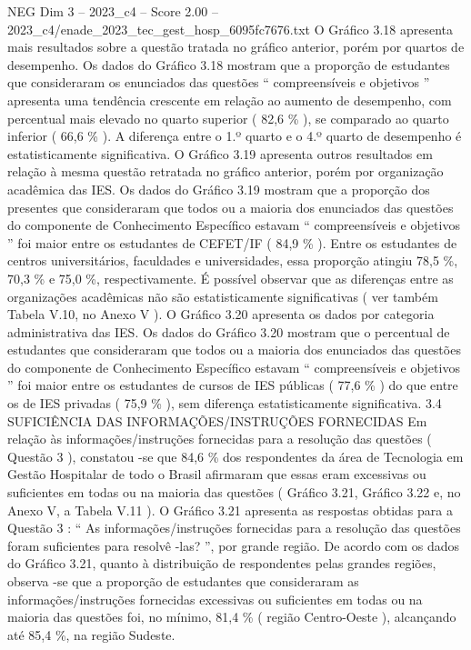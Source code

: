 \begin{textsample}{NEG Dim 3 – 2023\_c4 – Score 2.00 – 2023\_c4/enade\_2023\_tec\_gest\_hosp\_6095fc7676.txt}
O Gráfico 3.18 apresenta mais resultados sobre a questão tratada no gráfico anterior, porém por quartos de desempenho.
Os dados do Gráfico 3.18 mostram que a proporção de estudantes que consideraram os enunciados das questões “ compreensíveis e objetivos ” apresenta uma tendência crescente em relação ao aumento de desempenho, com percentual mais elevado no quarto superior ( 82,6 \% ), se comparado ao quarto inferior ( 66,6 \% ).
A diferença entre o 1.º quarto e o 4.º quarto de desempenho é estatisticamente significativa.
O Gráfico 3.19 apresenta outros resultados em relação à mesma questão retratada no gráfico anterior, porém por organização acadêmica das IES.
Os dados do Gráfico 3.19 mostram que a proporção dos presentes que consideraram que todos ou a maioria dos enunciados das questões do componente de Conhecimento Específico estavam “ compreensíveis e objetivos ” foi maior entre os estudantes de CEFET/IF ( 84,9 \% ).
Entre os estudantes de centros universitários, faculdades e universidades, essa proporção atingiu 78,5 \%, 70,3 \% e 75,0 \%, respectivamente.
É possível observar que as diferenças entre as organizações acadêmicas não são estatisticamente significativas ( ver também Tabela V.10, no Anexo V ).
O Gráfico 3.20 apresenta os dados por categoria administrativa das IES.
Os dados do Gráfico 3.20 mostram que o percentual de estudantes que consideraram que todos ou a maioria dos enunciados das questões do componente de Conhecimento Específico estavam “ compreensíveis e objetivos ” foi maior entre os estudantes de cursos de IES públicas ( 77,6 \% ) do que entre os de IES privadas ( 75,9 \% ), sem diferença estatisticamente significativa. 3.4 SUFICIÊNCIA DAS INFORMAÇÕES/INSTRUÇÕES FORNECIDAS Em relação às informações/instruções fornecidas para a resolução das questões ( Questão 3 ), constatou -se que 84,6 \% dos respondentes da área de Tecnologia em Gestão Hospitalar de todo o Brasil afirmaram que essas eram excessivas ou suficientes em todas ou na maioria das questões ( Gráfico 3.21, Gráfico 3.22 e, no Anexo V, a Tabela V.11 ).
O Gráfico 3.21 apresenta as respostas obtidas para a Questão 3 : “ As informações/instruções fornecidas para a resolução das questões foram suficientes para resolvê -las? ”, por grande região.
De acordo com os dados do Gráfico 3.21, quanto à distribuição de respondentes pelas grandes regiões, observa -se que a proporção de estudantes que consideraram as informações/instruções fornecidas excessivas ou suficientes em todas ou na maioria das questões foi, no mínimo, 81,4 \% ( região Centro-Oeste ), alcançando até 85,4 \%, na região Sudeste.

\end{textsample}
